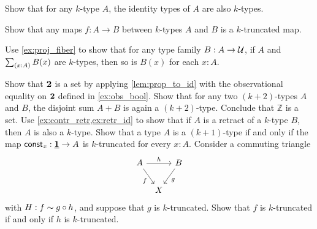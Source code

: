 \begin{exercises}
\begin{subexenum}
\item Show that for any $k$-type $A$, the identity types of $A$ are also $k$-types.
\item Show that any maps $f:A\to B$ between $k$-types $A$ and $B$
is a $k$-truncated map.
\item Use \cref{ex:proj_fiber} to show that for any type family $B:A\to \mathcal{U}$, if $A$ and $\sm{x:A}B(x)$ are $k$-types, then so is $B(x)$ for each $x:A$. 
\end{subexenum}
\exercise \label{ex:eq_bool}Show that $\mathbf{2}$ is a set by applying \cref{lem:prop_to_id} with the observational equality on $\mathbf{2}$ defined in \cref{ex:obs_bool}.
\exercise \label{ex:set_coprod}Show that for any two $(k+2)$-types $A$ and $B$, the disjoint sum $A+B$ is again a $(k+2)$-type. Conclude that $\mathbb{Z}$ is a set.
\exercise Use \cref{ex:contr_retr,ex:retr_id} to show that if $A$ is a retract of a $k$-type $B$, then $A$ is also a $k$-type.
\exercise Show that a type $A$ is a $(k+1)$-type if and only if the map $\mathsf{const}_x:\underline{\mathbf{1}}\to A$ is $k$-truncated for every $x:A$.
\exercise Consider a commuting triangle
\begin{equation*}
\begin{tikzcd}[column sep=tiny]
A \arrow[rr,"h"] \arrow[dr,swap,"f"] & & B \arrow[dl,"g"] \\
& X
\end{tikzcd}
\end{equation*}
with $H: f \sim g \circ h$, and suppose that $g$ is $k$-truncated. Show that $f$ is $k$-truncated if and only if $h$ is $k$-truncated.
\end{exercises}
